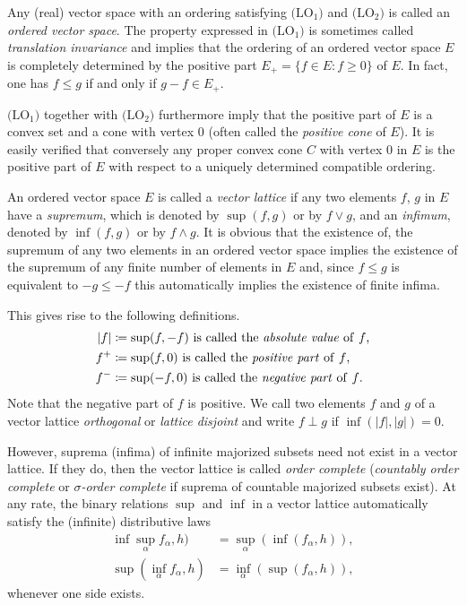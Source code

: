 Any (real) vector space with an ordering satisfying $ \text{(LO$_{1}$)} $ and $ \text{(LO$_{2}$)} $ is called an \emph{ordered vector space}.
The property expressed in $\text{(LO$_{1}$)}$ is sometimes called \emph{translation invariance} and implies that the ordering of an ordered vector space $ E $ is completely determined by the positive part $ E_{+} = \{f \in E \colon f \geq 0\} $ of\/ $ E $.
In fact, one has $ f \leq g $ if and only if\/ $ g - f \in E_{+} $.

$ \text{(LO$_{1}$)} $ together with $ \text{(LO$_{2}$)} $ furthermore imply that the positive part of\/ $ E $ is a convex set and a cone with vertex $ 0 $ (often called the \emph{positive cone} of\/ $ E $).
It is easily verified that conversely any proper convex cone $ C $ with vertex $ 0 $ in $ E $ is the positive part of\/ $ E $ with respect to a uniquely determined compatible ordering.

An ordered vector space $ E $ is called a \emph{vector lattice} if any two elements $ f $, $ g $ in $ E $ have a \emph{supremum}, which is denoted by $ \sup(f,g) $ or by $ f \vee g $, and an \emph{infimum}, denoted by $ \inf(f,g) $ or by $ f \wedge g $.
It is obvious that the existence of, \eg the supremum of any two elements in an ordered vector space implies the existence of the supremum of any finite number of elements in $ E $ and, since $ f \leq g $ is equivalent to $ -g \leq -f $ this automatically implies the existence of finite infima.

This gives rise to the following definitions.
\begin{align*}
	|f| 	& \coloneq \sup(f,-f)  \text{ is called the \emph{absolute value} of\/ $ f $,} \\
	f^{+}	& \coloneq \sup(f,0)   \text{ is called the \emph{positive part} of\/ $ f $,} \\
	f^{-}	& \coloneq \sup(-f,0)  \text{ is called the \emph{negative part} of\/ $ f $.}
\end{align*}
Note that the negative part of\/ $ f $ is positive.
We call two elements $ f $ and $ g $ of a vector lattice \emph{orthogonal} or \emph{lattice disjoint} and write $ f \perp g $ if\/ $ \inf(|f|,|g|) = 0 $.

However, suprema (infima) of infinite majorized subsets need not exist in a vector lattice.
If they do, then the vector lattice is called \emph{order complete} (\emph{countably order complete} or \emph{$ \sigma $-order complete} if suprema of countable majorized subsets exist).
At any rate, the binary relations $\sup$ and $\inf$ in a vector lattice automatically satisfy the (infinite) distributive laws
\begin{align*}
\inf   \sup_{\alpha} f_{\alpha},h  ) & = \sup_{\alpha}  ( \inf(f_{\alpha},h)  ) , \\
\sup(\inf_{\alpha}f_{\alpha},h) & = \inf_{\alpha}(\sup(f_{\alpha},h)),
\end{align*}
whenever one side exists.

